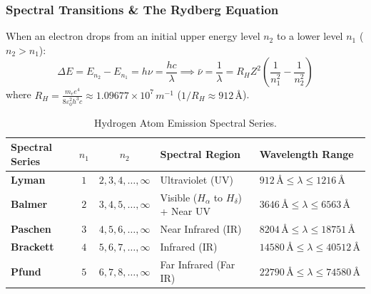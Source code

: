 \documentclass[10pt,twoside,openright]{book}
\begin{document}
\subsubsection{Spectral Transitions \& The Rydberg Equation}
When an electron drops from an initial upper energy level $n_2$ to a lower level $n_1$ ($n_2 > n_1$):
\begin{equation}
  \Delta E = E_{n_2} - E_{n_1} = h\nu = \frac{h c}{\lambda} \implies \bar{\nu} = \frac{1}{\lambda} = R_H Z^2 \left(\frac{1}{n_1^2} - \frac{1}{n_2^2}\right)
\end{equation}
where $R_H = \frac{m_e e^4}{8\varepsilon_0^2 h^3 c} \approx 1.09677 \times 10^7\,\si{m^{-1}}$ ($1/R_H \approx 912\,\text{\AA}$).

\begin{table}[htbp]
\centering
\footnotesize
\setlength{\tabcolsep}{3pt}
\renewcommand{\arraystretch}{1.2}
\begin{tabularx}{\textwidth}{>{\bfseries}l c c L Y}
\toprule
\textbf{Spectral Series} & \textbf{$n_1$} & \textbf{$n_2$} & \textbf{Spectral Region} & \textbf{Wavelength Range} \\
\midrule
Lyman & $1$ & $2, 3, 4, \dots, \infty$ & Ultraviolet (UV) & $912\,\text{\AA} \le \lambda \le 1216\,\text{\AA}$ \\
Balmer & $2$ & $3, 4, 5, \dots, \infty$ & Visible ($H_\alpha$ to $H_\delta$) + Near UV & $3646\,\text{\AA} \le \lambda \le 6563\,\text{\AA}$ \\
Paschen & $3$ & $4, 5, 6, \dots, \infty$ & Near Infrared (IR) & $8204\,\text{\AA} \le \lambda \le 18751\,\text{\AA}$ \\
Brackett & $4$ & $5, 6, 7, \dots, \infty$ & Infrared (IR) & $14580\,\text{\AA} \le \lambda \le 40512\,\text{\AA}$ \\
Pfund & $5$ & $6, 7, 8, \dots, \infty$ & Far Infrared (Far IR) & $22790\,\text{\AA} \le \lambda \le 74580\,\text{\AA}$ \\
\bottomrule
\end{tabularx}
\caption{Hydrogen Atom Emission Spectral Series.}
\end{table}
\end{document}
